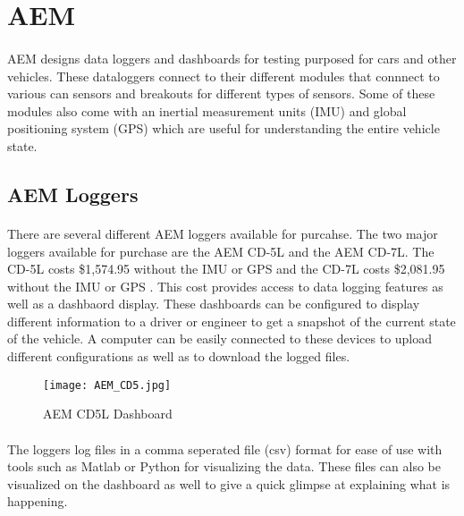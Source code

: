 \section{AEM}

\paragraph{}
AEM designs data loggers and dashboards for testing purposed for cars and other vehicles.
These dataloggers connect to their different modules that connnect to various can sensors and breakouts for different types of sensors.
Some of these modules also come with an inertial measurement units (IMU) and global positioning system (GPS) which are useful for understanding the entire vehicle state.

\subsection{AEM Loggers}

\paragraph{}
There are several different AEM loggers available for purcahse.
The two major loggers available for purchase are the AEM CD-5L and the AEM CD-7L.
The CD-5L costs \$1,574.95 without the IMU or GPS and the CD-7L costs \$2,081.95 without the IMU or GPS \cite{AEMSite}.
This cost provides access to data logging features as well as a dashbaord display.
These dashboards can be configured to display different information to a driver or engineer to get a snapshot of the current state of the vehicle.
A computer can be easily connected to these devices to upload different configurations as well as to download the logged files.

\begin{figure}[H]
	\centering
	\texttt{[image: AEM\_CD5.jpg]}
	\caption{AEM CD5L Dashboard}
	\label{fig:AEM_CD5}
\end{figure}

\paragraph{}
The loggers log files in a comma seperated file (csv) format for ease of use with tools such as Matlab or Python for visualizing the data.
These files can also be visualized on the dashboard as well to give a quick glimpse at explaining what is happening.

